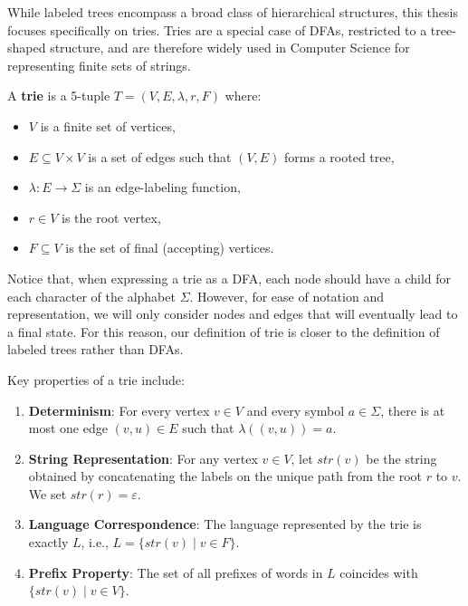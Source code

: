 While labeled trees encompass a broad class of hierarchical structures, this thesis focuses specifically on tries.
Tries are a special case of DFAs, restricted to a tree-shaped structure, and are therefore widely used in Computer Science for representing finite sets of strings.
\begin{definition}[Trie] \label{def:trie}
    A \textbf{trie} is a 5-tuple $T = (V, E, \lambda, r, F)$ where:
    \begin{itemize}
        \item $V$ is a finite set of vertices,
        \item $E \subseteq V \times V$ is a set of edges such that $(V,E)$ forms a rooted tree,
        \item $\lambda: E \to \Sigma$ is an edge-labeling function,
        \item $r \in V$ is the root vertex,
        \item $F \subseteq V$ is the set of final (accepting) vertices.
    \end{itemize}
\end{definition}
Notice that, when expressing a trie as a DFA, each node should have a child for each character of the alphabet $\Sigma$.
However, for ease of notation and representation, we will only consider nodes and edges that will eventually lead to a final state.
For this reason, our definition of trie is closer to the definition of labeled trees rather than DFAs.

Key properties of a trie include:
\begin{enumerate}
    \item \textbf{Determinism}: For every vertex $v \in V$ and every symbol $a \in \Sigma$, there is at most one edge $(v, u) \in E$ such that $\lambda((v, u)) = a$.
    \item \textbf{String Representation}: For any vertex $v \in V$, let $str(v)$ be the string obtained by concatenating the labels on the unique path from the root $r$ to $v$. We set $str(r) = \varepsilon$.
    \item \textbf{Language Correspondence}: The language represented by the trie is exactly $L$, i.e., $L = \{ str(v) \mid v \in F \}$.
    \item \textbf{Prefix Property}: The set of all prefixes of words in $L$ coincides with $\{ str(v) \mid v \in V \}$.
\end{enumerate}
 

